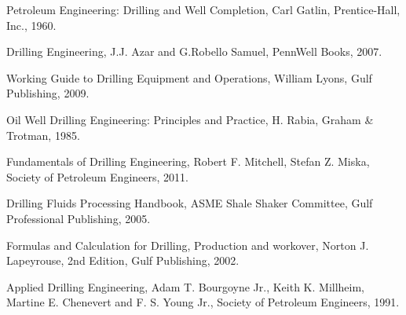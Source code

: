 \documentclass[11pt,a4paper]{report}
\begin{document}
\begin{thebibliography}{9}

Petroleum Engineering: Drilling and Well Completion, Carl Gatlin, Prentice-Hall, Inc.,
1960.
 
Drilling Engineering, J.J. Azar and G.Robello Samuel, PennWell Books, 2007.

 
Working Guide to Drilling Equipment and Operations, William Lyons, Gulf Publishing,
2009.

Oil Well Drilling Engineering: Principles and Practice, H. Rabia, Graham \& Trotman,
1985.

Fundamentals of Drilling Engineering, Robert F. Mitchell, Stefan Z. Miska, Society of
Petroleum Engineers, 2011.

Drilling Fluids Processing Handbook, ASME Shale Shaker Committee, Gulf
Professional Publishing, 2005.

Formulas and Calculation for Drilling, Production and workover, Norton J. Lapeyrouse,
2nd Edition, Gulf Publishing, 2002.

Applied Drilling Engineering, Adam T. Bourgoyne Jr., Keith K. Millheim, Martine E.
Chenevert and F. S. Young Jr., Society of Petroleum Engineers, 1991.


\end{thebibliography}
\end{document}

